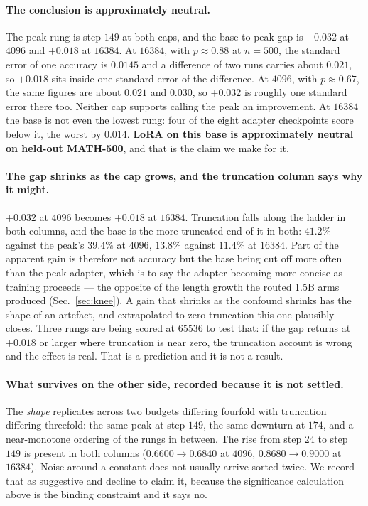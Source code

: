 \paragraph{The conclusion is approximately neutral.} The peak rung is step $149$ at both
caps, and the base-to-peak gap is $+0.032$ at $4096$ and $+0.018$ at $16384$. At $16384$,
with $p \approx 0.88$ at $n=500$, the standard error of one accuracy is $0.0145$ and a
difference of two runs carries about $0.021$, so $+0.018$ sits inside one standard error of
the difference. At $4096$, with $p \approx 0.67$, the same figures are about $0.021$ and
$0.030$, so $+0.032$ is roughly one standard error there too. Neither cap supports calling
the peak an improvement. At $16384$ the base is not even the lowest rung: four of the eight
adapter checkpoints score below it, the worst by $0.014$. \textbf{LoRA on this base is
approximately neutral on held-out MATH-500}, and that is the claim we make for it.

\paragraph{The gap shrinks as the cap grows, and the truncation column says why it might.}
$+0.032$ at $4096$ becomes $+0.018$ at $16384$. Truncation falls along the ladder in both
columns, and the base is the more truncated end of it in both: $41.2\%$ against the peak's
$39.4\%$ at $4096$, $13.8\%$ against $11.4\%$ at $16384$. Part of the apparent gain is
therefore not accuracy but the base being cut off more often than the peak adapter, which is
to say the adapter becoming more concise as training proceeds --- the opposite of the length
growth the routed 1.5B arms produced (Sec.~\ref{sec:knee}). A gain that shrinks as the
confound shrinks has the shape of an artefact, and extrapolated to zero truncation this one
plausibly closes. Three rungs are being scored at $65536$ to test that: if the gap returns at
$+0.018$ or larger where truncation is near zero, the truncation account is wrong and the
effect is real. That is a prediction and it is not a result.

\paragraph{What survives on the other side, recorded because it is not settled.} The
\emph{shape} replicates across two budgets differing fourfold with truncation differing
threefold: the same peak at step $149$, the same downturn at $174$, and a near-monotone
ordering of the rungs in between. The rise from step $24$ to step $149$ is present in both
columns ($0.6600 \to 0.6840$ at $4096$, $0.8680 \to 0.9000$ at $16384$). Noise around a
constant does not usually arrive sorted twice. We record that as suggestive and decline to
claim it, because the significance calculation above is the binding constraint and it says no.

